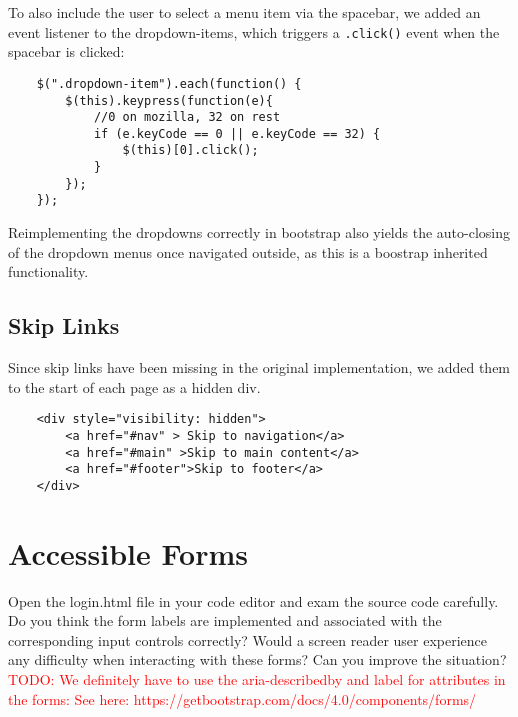 \documentclass[a4paper,11pt]{article}
\newcommand\todo[1]{\textcolor{red}{TODO: #1}}
\theoremstyle{mytheor}
\begin{document}
To also include the user to select a menu item via the spacebar, we added an event listener to the dropdown-items, which triggers a \texttt{.click()} event when the spacebar is clicked:

\begin{verbatim}
    $(".dropdown-item").each(function() {
        $(this).keypress(function(e){
            //0 on mozilla, 32 on rest
            if (e.keyCode == 0 || e.keyCode == 32) {      
                $(this)[0].click();
            }
        });
    });
\end{verbatim}

Reimplementing the dropdowns correctly in bootstrap also yields the auto-closing of the dropdown menus once navigated outside, as this is a boostrap inherited functionality. 

\subsection{Skip Links}
Since skip links have been missing in the original implementation, we added them to the start of each page as a hidden div. 

\begin{verbatim}
    <div style="visibility: hidden">
        <a href="#nav" > Skip to navigation</a>
        <a href="#main" >Skip to main content</a>
        <a href="#footer">Skip to footer</a>
    </div>
\end{verbatim}

\section{Accessible Forms}
Open the login.html file in your code editor and exam the source code carefully. Do you think the form labels
are implemented and associated with the corresponding input controls correctly? Would a screen reader user
experience any difficulty when interacting with these forms? Can you improve the situation?\\

\todo{We definitely have to use the aria-describedby and label for attributes in the forms: 
See here: https://getbootstrap.com/docs/4.0/components/forms/}
\end{document}

